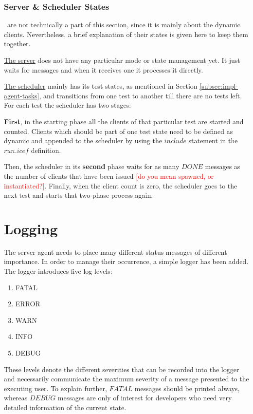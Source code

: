 \subsubsection{Server \& Scheduler States}\ are not technically a part of this section, since it is mainly about the dynamic clients. Nevertheless, a brief explanation of their states is given here to keep them together.

\underline{The server} does not have any particular mode or state management yet. It just waits for messages and when it receives one it processes it directly.

\underline{The scheduler} mainly has its test states, as mentioned in Section \ref{subsec:impl-agent-tasks}, and transitions from one test to another till there are no tests left. For each test the scheduler has two stages:
\begin{packed_item1}
\small
\item \textbf{First}, in the starting phase all the clients of that particular test are started and counted. Clients which should be part of one test state need to be defined as dynamic and appended to the scheduler by using the $include$ statement in the $run.icef$ definition.
\item Then, the scheduler in its \textbf{second} phase waits for as many $DONE$ messages as the number of clients that have been issued \textcolor{red}{[do you mean spawned, or instantiated?]}. Finally, when the client count is zero, the scheduler goes to the next test and starts that two-phase process again.
\end{packed_item1}


\section{Logging}
\label{sec:impl-log}

The server agent needs to place many different status messages of different importance. In order to manage their occurrence, a simple logger has been added. The logger introduces five log levels:
\begin{enumerate}
	\item FATAL
	\item ERROR
	\item WARN
	\item INFO
	\item DEBUG
\end{enumerate}
These levels denote the different severities that can be recorded into the logger and necessarily communicate the maximum severity of a message presented to the executing user. To explain further, $FATAL$ messages should be printed always, whereas $DEBUG$ messages are only of interest for developers who need very detailed information of the current state.

